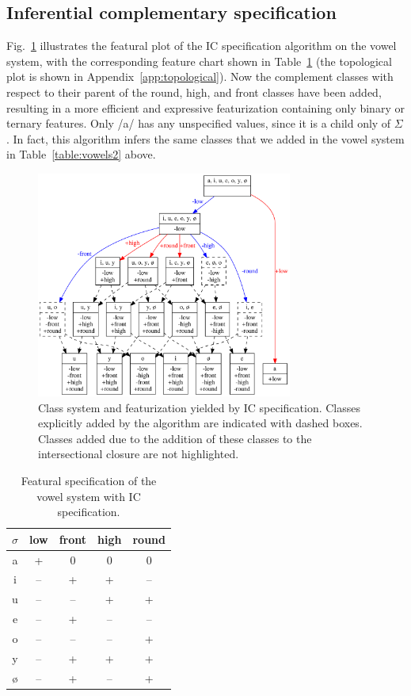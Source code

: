 \documentclass[12pt, oneside]{article}   	%
\begin{document}
\subsection{Inferential complementary specification}

Fig.~\ref{fig:vowel_inventory_ic} illustrates the featural plot of the IC specification algorithm on the vowel system, with the corresponding feature chart shown in Table~\ref{table:vowel_inventory_ic} (the topological plot is shown in Appendix~\ref{app:topological}). Now the complement classes with respect to their parent of the round, high, and front classes have been added, resulting in a more efficient and expressive featurization containing only binary or ternary features. Only /a/ has any unspecified values, since it is a child only of $\Sigma$. In fact, this algorithm infers the same classes that we added in the vowel system in Table~\ref{table:vowels2} above.

\begin{figure}[htb!]
	\centering
	\includegraphics[width=0.75\textwidth]{vowel_inventory_ic_FEATURAL.png}
	\caption{Class system and featurization yielded by IC specification. Classes explicitly added by the algorithm are indicated with dashed boxes. Classes added due to the addition of these classes to the intersectional closure are not highlighted.}
	\label{fig:vowel_inventory_ic}
\end{figure}

\begin{table}[htb!]
	\centering
	\begin{tabular} {|c||c|c|c|c|}
		\hline
		$\sigma$ & low & front & high & round \\ \hline
		a & + & 0 & 0 & 0 \\
		i & -- & + & + & -- \\
		u & -- & -- & + & + \\
		e & -- & + & -- & -- \\
		o & -- & -- & -- & + \\
		y & -- & + & + & + \\
		\o & -- & + & -- & + \\
		\hline
	\end{tabular}
	\caption{Featural specification of the vowel system with IC specification.}
	\label{table:vowel_inventory_ic}
\end{table}
\end{document}
